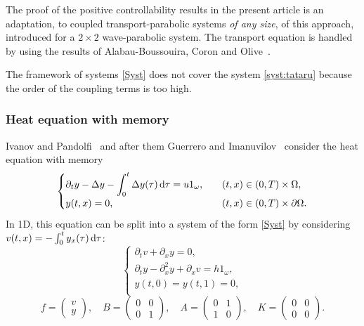 \documentclass[10pt]{amsart}
\theoremstyle{plain}
\theoremstyle{definition}
\theoremstyle{remark}
\newcommand{\diff}[1][-3]{\ensuremath{\mathop{}\mkern#1mu\mathrm{d}}}
\let\dpl\displaystyle
\begin{document}
The proof of the positive controllability results in the present article is an adaptation, to coupled transport-parabolic systems \emph{of any size}, of this approach, introduced for a $2\times2$ wave-parabolic system. The transport equation is handled by using the results of Alabau-Boussouira, Coron and Olive~\cite{alabau-boussouira_2017}.

The framework of systems \eqref{Syst} does not cover the system \eqref{syst:tataru} because the order of the coupling terms is too high.

\subsubsection{Heat equation with memory}
Ivanov and Pandolfi~\cite{ivanov_2009} and after them Guerrero and Imanuvilov~\cite{guerrero_2013} consider the heat equation with memory
\begin{equation} \label{chaleur_mem}
\begin{cases}
\dpl\partial_t y - \Delta y - \int_0^t \Delta y (\tau) \diff \tau = u 1_\omega, \quad & (t,x)\in(0,T)\times\Omega, \\
y(t,x)=0, & (t,x)\in(0,T)\times\partial\Omega.
\end{cases}
\end{equation}
In 1D, this equation can be split into a system of the form \eqref{Syst} by considering $v(t,x)=-\int_0^t y_x(\tau) \diff \tau$:
\begin{equation} \label{chaleur_mem_syst}
\begin{cases}
\partial_t v +\partial_x y = 0, \\
\partial_t y - \partial_x^2 y + \partial_xv = h 1_{\omega}, \\
y(t,0)=y(t,1)=0, \\
\end{cases}
\end{equation}
\ie
\[
f=\begin{pmatrix}
v \\ y
\end{pmatrix}, \quad
B=\begin{pmatrix}
0 & 0 \\ 0 & 1
\end{pmatrix}, \quad
A=\begin{pmatrix}
0 & 1 \\ 1 & 0
\end{pmatrix}, \quad
K=\begin{pmatrix}
0 & 0 \\ 0 & 0
\end{pmatrix}.
\]
\end{document}
